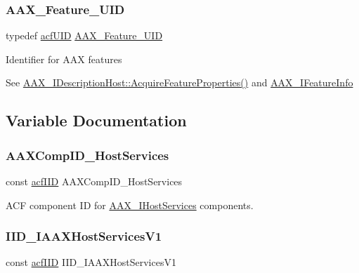 \subsubsection{\texorpdfstring{AAX\_Feature\_UID}{AAX\_Feature\_UID}}
{\footnotesize\ttfamily typedef \mbox{\hyperlink{a00269_ab19414382287ff80930c48a196145214}{acf\+U\+ID}} \mbox{\hyperlink{a00392_a53d6cf8a08224b3e813333e411ce798e}{A\+A\+X\+\_\+\+Feature\+\_\+\+U\+ID}}}

Identifier for A\+AX features

See \mbox{\hyperlink{a01793_aa0d9e27d0207113f98c217d870bfa5e9}{A\+A\+X\+\_\+\+I\+Description\+Host\+::\+Acquire\+Feature\+Properties()}} and \mbox{\hyperlink{a01829}{A\+A\+X\+\_\+\+I\+Feature\+Info}} 

\subsection{Variable Documentation}
\mbox{\label{a00683_a0790e4ae407d6560ce1f605f29df324f}} 
\subsubsection{\texorpdfstring{AAXCompID\_HostServices}{AAXCompID\_HostServices}}
{\footnotesize\ttfamily const \mbox{\hyperlink{a00269_a59df0b41744eee7a066787aaedf97f67}{acf\+I\+ID}} A\+A\+X\+Comp\+I\+D\+\_\+\+Host\+Services}



A\+CF component ID for \mbox{\hyperlink{a01841}{A\+A\+X\+\_\+\+I\+Host\+Services}} components. 

\mbox{\label{a00683_aa2268f8c1f129f4f75a27ea3f4a4183b}} 
\subsubsection{\texorpdfstring{IID\_IAAXHostServicesV1}{IID\_IAAXHostServicesV1}}
{\footnotesize\ttfamily const \mbox{\hyperlink{a00269_a59df0b41744eee7a066787aaedf97f67}{acf\+I\+ID}} I\+I\+D\+\_\+\+I\+A\+A\+X\+Host\+Services\+V1}



